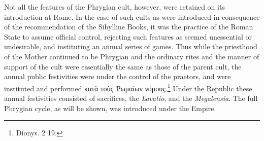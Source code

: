 \documentclass[a4paper, 11pt, oneside, polutonikogreek, french]{article}
\begin{document}
Not all the features of the Phrygian cult, however, were retained on its introduction at Rome. In the case of such cults as were introduced in consequence of the recommendation of the Sibylline Books, it was the practice of the Roman State to assume official control, rejecting such features as seemed unessential or undesirable, and instituting an annual series of games. Thus while the priesthood of the Mother continued to be Phrygian and the ordinary rites and the manner of support of the cult were essentially the same as those of the parent cult, the annual public festivities were under the control of the praetors, and were instituted and performed κατὰ τοὺς Ῥωμαίων νόμους.\footnote{Dionys. 2 19.} Under the Republic these annual festivities consisted of sacrifices, the \emph{Lavatio}, and the \emph{Megalensia}. The full Phrygian cycle, as will be shown, was introduced under the Empire.
\end{document}
